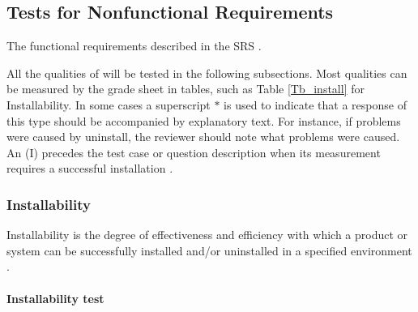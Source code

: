 \documentclass[12pt, titlepage]{article}
\begin{document}
\subsection{Tests for Nonfunctional Requirements} \label{sec_nonfuncreqtest}

The functional requirements described in the SRS \cite{Dong2019SRS}.


All the qualities of \progname{} will be tested in the following 
subsections. Most qualities can be measured by the grade sheet in tables, such
as Table \ref{Tb_install} for Installability. In some cases a superscript $*$
is used to indicate that a response of this type should be accompanied by
explanatory text. For instance, if problems were caused by uninstall, the
reviewer should note what problems were caused. An (I) precedes the test case
or question description when its measurement requires a successful installation
\cite{SmithEtAl2018}.

\subsubsection{Installability}
\label{sec_installtest} Installability is the degree of effectiveness and
efficiency with which a product or system can be successfully installed and/or
uninstalled in a specified environment \cite{ISO/IEC25010:2011}.
	
\paragraph{Installability test}
\end{document}
